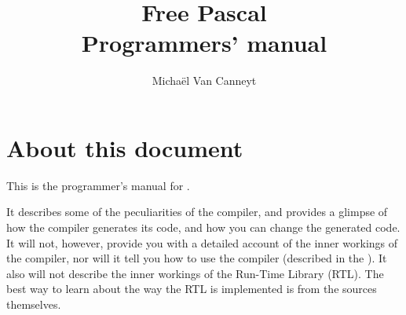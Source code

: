 %
%
%
%
%

%
%
\makeindex
{}
%
%

\title{Free Pascal \\ Programmers' manual}

\author{Micha\"el Van Canneyt}
\maketitle
\tableofcontents
\newpage
\listoftables
\newpage

\section*{About this document}
This is the programmer's manual for \fpc.

It describes some of the peculiarities of the \fpc compiler, and provides a
glimpse of how the compiler generates its code, and how you can change the
generated code. It will not, however, provide you with a detailed account of
the inner workings of the compiler, nor will it tell you how to use the
compiler (described in the \userref). It also will not describe the inner
workings of the Run-Time Library (RTL). The best way to learn about the way
the RTL is implemented is from the sources themselves.

